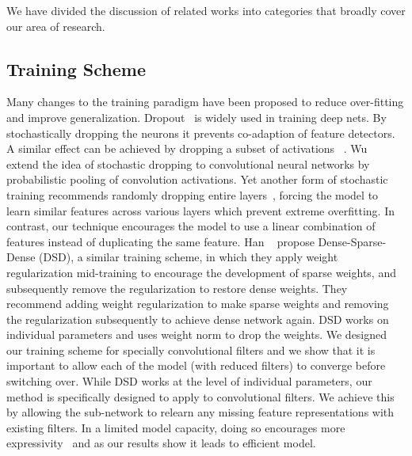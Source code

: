 We have divided the discussion of related works into categories that broadly cover our area of research.

\subsection{Training Scheme } 
Many changes to the training paradigm have been proposed to reduce over-fitting and improve generalization.
Dropout~\cite{Wu2015TowardsDT} is widely used in training deep nets. 
By stochastically dropping the neurons it prevents co-adaption of feature detectors.
A similar effect can be achieved by dropping a subset of activations ~\cite{Wan2013RegularizationON}.
Wu \etal~\cite{Wu2015TowardsDT} extend the idea of stochastic dropping to convolutional neural networks by probabilistic pooling of convolution activations.
Yet another form of stochastic training recommends randomly dropping entire layers~\cite{Huang2016DeepNW}, forcing the model to learn similar features across various layers which prevent extreme overfitting.
In contrast, our technique encourages the model to use a linear combination of features instead of duplicating the same feature.
Han \etal~\cite{Han2016DSDDT} propose Dense-Sparse-Dense (DSD), a similar training scheme, in which they apply weight regularization mid-training to encourage the development of sparse weights, and subsequently remove the regularization to restore dense weights.
They recommend adding weight regularization to make sparse weights and removing the regularization subsequently to achieve dense network again.
DSD works on individual parameters and uses weight norm to drop the weights. 
We designed our training scheme for specially convolutional filters and we show that it is important to allow each of the model (with reduced filters) to converge before switching over. 
While DSD works at the level of individual parameters, our method is specifically designed to apply to convolutional filters.
We achieve this by allowing the sub-network to relearn any missing feature representations with existing filters.
In a limited model capacity, doing so encourages more expressivity~\cite{Raghu2017OnTE} and as our results show it leads to efficient model.



